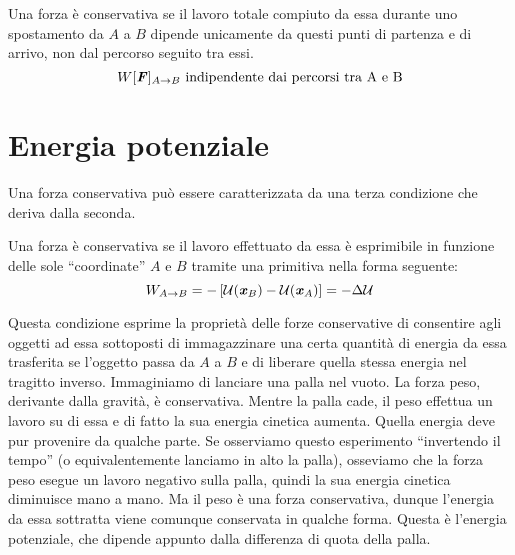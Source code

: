 \vspace{8pt}
\begin{tcolorbox}[colback = red!30, colframe = red!30!black, title = {Forza conservativa (condizione II)}]
    Una forza è conservativa se il lavoro totale compiuto da essa durante uno spostamento
    da $A$ a $B$ dipende unicamente da questi punti di partenza e di arrivo, non
    dal percorso seguito tra essi.
    \[ W[\textbf{\textit{F}}]_{A\to B} \text{ indipendente dai percorsi tra A e B} \]
\end{tcolorbox}
\vspace{5pt}

\section{Energia potenziale}
Una forza conservativa può essere caratterizzata da una terza condizione che deriva
dalla seconda.

\vspace{8pt}
\begin{tcolorbox}[colback = red!30, colframe = red!30!black, title = {Forza conservativa (condizione III)}]
    Una forza è conservativa se il lavoro effettuato da essa è esprimibile in
    funzione delle sole ``coordinate'' $A$ e $B$ tramite una primitiva nella forma
    seguente:
    \[ W_{A\to B} = -\left[\mathcal{U}(\textbf{\textit{x}}_B) - \mathcal{U}(\textbf{\textit{x}}_A)\right] = -\Delta\mathcal{U} \]
\end{tcolorbox}
\vspace{5pt}

\noindent Questa condizione esprime la proprietà delle forze conservative di
consentire agli oggetti ad essa sottoposti di immagazzinare una certa quantità
di energia da essa trasferita se l'oggetto passa da $A$ a $B$ e di liberare
quella stessa energia nel tragitto inverso. Immaginiamo di lanciare una palla
nel vuoto. La forza peso, derivante dalla gravità, è conservativa. Mentre la
palla cade, il peso effettua un lavoro su di essa e di fatto la sua energia
cinetica aumenta. Quella energia deve pur provenire da qualche parte. Se osserviamo
questo esperimento ``invertendo il tempo'' (o equivalentemente lanciamo in alto
la palla), osseviamo che la forza peso esegue un lavoro negativo sulla palla,
quindi la sua energia cinetica diminuisce mano a mano. Ma il peso è una forza
conservativa, dunque l'energia da essa sottratta viene comunque conservata
in qualche forma. Questa è l'energia potenziale, che dipende appunto dalla differenza
di quota della palla.

